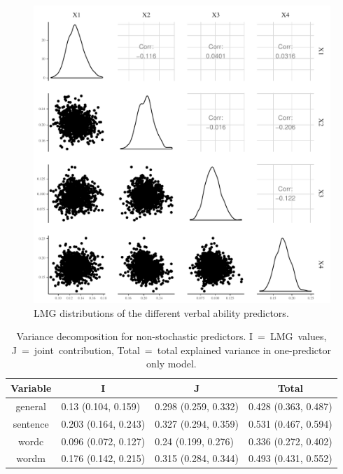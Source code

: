 \documentclass[11pt,a4paper,twoside]{book}
\newenvironment{knitrout}{}{} %
\begin{document}
\begin{knitrout}
\color{fgcolor}\begin{figure}

{\centering \includegraphics[width=\textwidth-3cm]{figure/ch03_figempi_lmg_plot-1} 

}

\caption[LMG distributions of the different verbal ability predictors]{LMG distributions of the different verbal ability predictors.}\label{fig:empi.lmg.plot}
\end{figure}


\end{knitrout}


\begin{table}[h]
\caption{Variance decomposition for non-stochastic predictors. I~=~LMG~values, J~=~joint~contribution, Total~=~total explained variance in one-predictor only model.}
\centering
\begin{tabular}{clll}
  \toprule
  \multicolumn{1}{c}{\textbf{Variable}} & \multicolumn{1}{c}{\textbf{I}} &\multicolumn{1}{c}{\textbf{J}} & \multicolumn{1}{c}{\textbf{Total}} \\
  \hline
general & 0.13 (0.104, 0.159)  & 0.298 (0.259, 0.332)   & 0.428 (0.363, 0.487)  \\ 
sentence & 0.203 (0.164, 0.243)  & 0.327 (0.294, 0.359)   & 0.531 (0.467, 0.594)  \\ 
wordc & 0.096 (0.072, 0.127)  & 0.24 (0.199, 0.276)   & 0.336 (0.272, 0.402)  \\ 
wordm & 0.176 (0.142, 0.215)  & 0.315 (0.284, 0.344)   & 0.493 (0.431, 0.552)  \\ 
   \bottomrule
\end{tabular}
\label{tbl:empirical.ijt}
\end{table}
\end{document}
